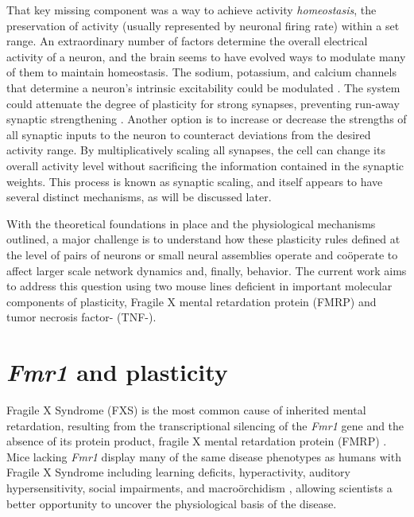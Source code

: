 That key missing component was a way to achieve activity \textit{homeostasis}, the preservation of activity (usually represented by neuronal firing rate) within a set range. An extraordinary number of factors determine the overall electrical activity of a neuron, and the brain seems to have evolved ways to modulate many of them to maintain homeostasis. The sodium, potassium, and calcium channels that determine a neuron's intrinsic excitability could be modulated \cite{Franklin1992}. The system could attenuate the degree of plasticity for strong synapses, preventing run-away synaptic strengthening \cite{VanRossum2000}. Another option is to increase or decrease the strengths of all synaptic inputs to the neuron to counteract deviations from the desired activity range. By multiplicatively scaling all synapses, the cell can change its overall activity level without sacrificing the information contained in the synaptic weights. This process is known as synaptic scaling, and itself appears to have several distinct mechanisms, as will be discussed later.

With the theoretical foundations in place and the physiological mechanisms outlined, a major challenge is to understand how these plasticity rules defined at the level of pairs of neurons or small neural assemblies operate and co\"operate to affect larger scale network dynamics and, finally, behavior. The current work aims to address this question using two mouse lines deficient in important molecular components of plasticity, Fragile X mental retardation protein (FMRP) and tumor necrosis factor-\textalpha{} (TNF-\textalpha{}).

\section{\textit{Fmr1} and plasticity}

Fragile X Syndrome (FXS) is the most common cause of inherited mental retardation, resulting from the transcriptional silencing of the \textit{Fmr1} gene and the absence of its protein product, fragile X mental retardation protein (FMRP) \cite{Bailey1998, Jin2003}. Mice lacking \textit{Fmr1} display many of the same disease phenotypes as humans with Fragile X Syndrome including learning deficits, hyperactivity, auditory hypersensitivity, social impairments, and macro\"orchidism \cite{DutchBelgianFragileXConsortium1994, Bernardet2006, Moy2008}, allowing scientists a better opportunity to uncover the physiological basis of the disease.

